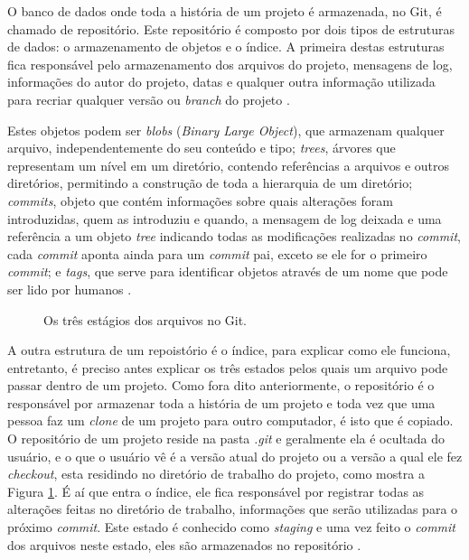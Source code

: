 \documentclass[diss]{template/setrem}
\begin{document}
O banco de dados onde toda a história de um projeto é armazenada, no Git, é chamado de repositório. Este repositório é composto por dois tipos de estruturas de dados: o armazenamento de objetos e o índice. A primeira destas estruturas fica responsável pelo armazenamento dos arquivos do projeto, mensagens de log, informações do autor do projeto, datas e qualquer outra informação utilizada para recriar qualquer versão ou \emph{branch} do projeto \citep{Loeliger2009}.

Estes objetos podem ser \emph{blobs} (\emph{Binary Large Object}), que armazenam qualquer arquivo, independentemente do seu conteúdo e tipo; \emph{trees}, árvores que representam um nível em um diretório, contendo referências a arquivos e outros diretórios, permitindo a construção de toda a hierarquia de um diretório; \emph{commits}, objeto que contém informações sobre quais alterações foram introduzidas, quem as introduziu e quando, a mensagem de log deixada e uma referência a um objeto \emph{tree} indicando todas as modificações realizadas no \emph{commit}, cada \emph{commit} aponta ainda para um \emph{commit} pai, exceto se ele for o primeiro \emph{commit}; e \emph{tags}, que serve para identificar objetos através de um nome que pode ser lido por humanos \citep{Loeliger2009}.

\begin{figure}[!h]
    \caption{Os três estágios dos arquivos no Git.}
    \label{fig:git-states}
\end{figure}

A outra estrutura de um repoistório é o índice, para explicar como ele funciona, entretanto, é preciso antes explicar os três estados pelos quais um arquivo pode passar dentro de um projeto. Como fora dito anteriormente, o repositório é o responsável por armazenar toda a história de um projeto e toda vez que uma pessoa faz um \emph{clone} de um projeto para outro computador, é isto que é copiado. O repositório de um projeto reside na pasta \emph{.git} e geralmente ela é ocultada do usuário, e o que o usuário vê é a versão atual do projeto ou a versão a qual ele fez \emph{checkout}, esta residindo no diretório de trabalho do projeto, como mostra a Figura \ref{fig:git-states}. É aí que entra o índice, ele fica responsável por registrar todas as alterações feitas no diretório de trabalho, informações que serão utilizadas para o próximo \emph{commit}. Este estado é conhecido como \emph{staging} e uma vez feito o \emph{commit} dos arquivos neste estado, eles são armazenados no repositório \citep{Chacon2009}.
\end{document}
